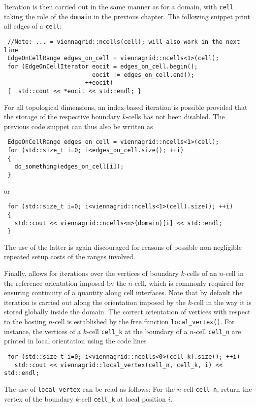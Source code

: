 Iteration is then carried out in the same manner as for a domain, with \lstinline|cell| taking the role of the \lstinline|domain| in the previous chapter.
The following snippet print all edges of a \lstinline|cell|:
\begin{lstlisting}
 //Note: ... = viennagrid::ncells(cell); will also work in the next line
 EdgeOnCellRange edges_on_cell = viennagrid::ncells<1>(cell);
 for (EdgeOnCellIterator eocit = edges_on_cell.begin();
                         eocit != edges_on_cell.end();
                       ++eocit)
 {  std::cout << *eocit << std::endl; } 
\end{lstlisting}

For all topological dimensions, an index-based iteration is possible provided that the storage of the respective boundary $k$-cells has not been disabled. The previous code snippet can thus also be written as
\begin{lstlisting}
 EdgeOnCellRange edges_on_cell = viennagrid::ncells<1>(cell);
 for (std::size_t i=0; i<edges_on_cell.size(); ++i)
 { 
   do_something(edges_on_cell[i]);
 }
\end{lstlisting}
or
\begin{lstlisting}
 for (std::size_t i=0; i<viennagrid::ncells<1>(cell).size(); ++i)
 {
   std::cout << viennagrid::ncells<n>(domain)[i] << std::endl;
 }
\end{lstlisting}
The use of the latter is again discouraged for reasons of possible non-negligible repeated setup costs of the ranges involved.


Finally, {\ViennaGrid} allows for iterations over the vertices of boundary $k$-cells of an $n$-cell in the reference orientation imposed by the $n$-cell, which is commonly required for ensuring continuity of a quantity along cell interfaces. Note that by default the iteration is carried out along the orientation imposed by the $k$-cell in the way it is stored globally inside the domain.
The correct orientation of vertices with respect to the hosting $n$-cell is established by the free function \lstinline|local_vertex()|. 
For instance, the vertices of a $k$-cell \lstinline|cell_k| at the boundary of a $n$-cell \lstinline|cell_n| are printed in local orientation using the code lines
\begin{lstlisting}
 for (std::size_t i=0; i<viennagrid::ncells<0>(cell_k).size(); ++i)
   std::cout << viennagrid::local_vertex(cell_n, cell_k, i) << std::endl;
\end{lstlisting}
The use of \lstinline|local_vertex| can be read as follows: For the $n$-cell \lstinline|cell_n|, return the vertex of the boundary $k$-cell \lstinline|cell_k| at local position $i$.

